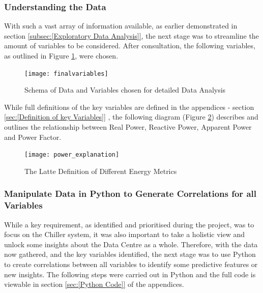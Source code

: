 \documentclass[12pt]{scrartcl}
\begin{document}
\subsubsection{Understanding the Data}
\label{subsubsec:[Understanding the Data]}

With such a vast array of information available, as earlier demonstrated in section \ref{subsec:[Exploratory Data Analysis]}, the next stage was to streamline the amount of variables to be considered. After consultation, the following variables, as outlined in Figure \ref{fig:finalvariables}, were chosen.  

\begin{figure}[H]
  \caption{Schema of Data and Variables chosen for detailed Data Analysis}
  \label{fig:finalvariables}
  \centering
    \texttt{[image: finalvariables]}
\end{figure} 

While full definitions of the key variables are defined in the appendices - section \ref{sec:[Definition of key Variables]} , the following diagram (Figure \ref{fig:coffeeenergyanaliogy}) describes and outlines the relationship between Real Power, Reactive Power, Apparent Power and Power Factor. 

\begin{figure}[H]
  \caption{The Latte Definition of Different Energy Metrics}
  \label{fig:coffeeenergyanaliogy}
  \centering
    \texttt{[image: power\_explanation]}
\end{figure} 

\subsubsection{Manipulate Data in Python to Generate Correlations for all Variables}
\label{subsubsec:[Manipulate Data in Python to Generate Correlations for all Variables]}

While a key requirement, as identified and prioritised during the project, was to focus on the Chiller system, it was also important to take a holistic view and unlock some insights about the Data Centre as a whole. Therefore, with the data now gathered, and the key variables identified, the next stage was to use Python to create correlations between all variables to identify some predictive features or new insights. The following steps were carried out in Python and the full code is viewable in section \ref{sec:[Python Code]} of the appendices.
\end{document}

